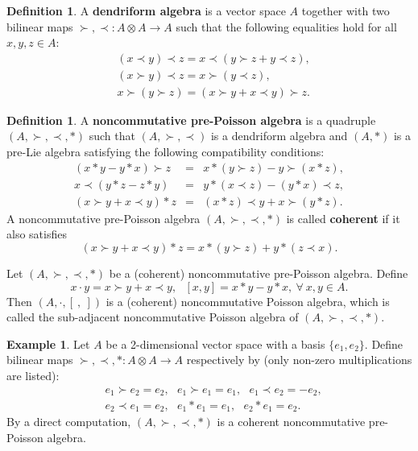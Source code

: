 \documentclass[12pt]{amsart}
\theoremstyle{definition}
\newtheorem{defi}[thm]{Definition}
\newtheorem{ex}[thm]{Example}
\begin{document}
\begin{defi} A {\bf dendriform algebra} is a vector space $A$ together with two bilinear maps 
$\succ,\prec:A\otimes A\longrightarrow A$ such that the following equalities hold for all $x,y,z\in A$:
  \begin{align*}&
    (x\prec y)\prec z=x\prec (y\succ z+y\prec z),\\&
    (x\succ y)\prec z=x\succ(y\prec z),\\&
    x\succ(y\succ z)=(x\succ y+x\prec y)\succ z.
  \end{align*}
  \end{defi}

\begin{defi}
  A {\bf noncommutative pre-Poisson algebra} is a quadruple $(A,\succ,\prec,\ast)$ such that $(A,\succ,\prec)$ is a dendriform algebra and $(A,\ast)$ is a pre-Lie algebra satisfying the following compatibility conditions:
  \begin{eqnarray}
    \label{Np1}(x\ast y-y\ast x)\succ z&=&x\ast(y\succ z)-y\succ(x\ast z),\\
    \label{Np2} x\prec(y\ast z-z\ast y)&=&y\ast(x\prec z)-(y\ast x)\prec z,\\
    \label{Np3} (x\succ y+x\prec y)\ast z&=&(x\ast z)\prec y+x\succ(y\ast z).
  \end{eqnarray}
  A noncommutative pre-Poisson algebra $(A,\succ,\prec,\ast)$  is called {\bf coherent} if it also satisfies
  \begin{equation}\label{Np4}
    (x\succ y+x\prec y)\ast z=x\ast(y\succ z)+y\ast(z\prec x).
  \end{equation}
\end{defi}

Let $(A,\succ,\prec,\ast)$ be a (coherent) noncommutative pre-Poisson algebra.
Define
  	\begin{equation*}x\cdot y=x\succ y+x\prec y, \ \ \ [x,y]=x\ast y-y\ast x,~\forall ~x,y\in A.\end{equation*} 
  Then $(A,\cdot, [ \ , \ ])$ is a (coherent) noncommutative Poisson algebra, which is called the 
  sub-adjacent noncommutative Poisson algebra of $(A,\succ,\prec,\ast)$.
  
\begin{ex} \label{Ae}  Let $A$ be a 2-dimensional vector space with a basis $\{e_1,e_2\}$.
Define bilinear maps $\succ,\prec,\ast:A\otimes A \longrightarrow A$ respectively by
 (only non-zero multiplications are listed):
\begin{align*} &e_1\succ e_2=e_2,\ \ \ e_1 \succ e_1=e_1, \ \ \ e_1 \prec e_2=-e_2,
 \\& e_2\prec e_1=e_2 , \ \ \  e_1\ast e_1=e_1, \ \ \ e_2\ast e_1=e_2. \end{align*}  
  By a direct computation, $(A,\succ,\prec,\ast)$ is a coherent noncommutative pre-Poisson algebra.
\end{ex}
\end{document}
